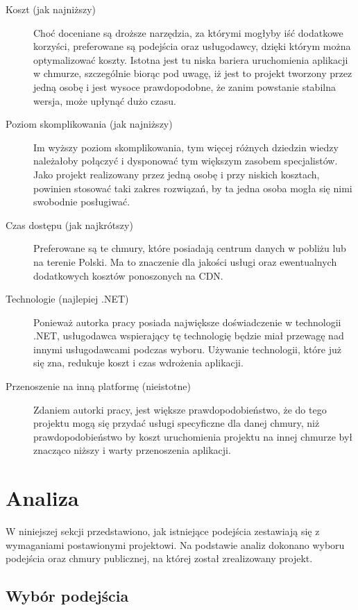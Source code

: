 \documentclass[12pt,a4paper,twoside,titlepage,openright]{book}
\begin{document}
\begin{description}
\item [Koszt (jak najniższy)] Choć doceniane są droższe narzędzia, za którymi mogłyby iść dodatkowe korzyści, preferowane są podejścia oraz usługodawcy, dzięki którym można optymalizować koszty. Istotna jest tu niska bariera uruchomienia aplikacji w chmurze, szczególnie biorąc pod uwagę, iż jest to projekt tworzony przez jedną osobę i jest wysoce prawdopodobne, że zanim powstanie stabilna wersja, może upłynąć dużo czasu.
\item [Poziom skomplikowania (jak najniższy)] Im wyższy poziom skomplikowania, tym więcej różnych dziedzin wiedzy należałoby połączyć i dysponować tym większym zasobem specjalistów. Jako projekt realizowany przez jedną osobę i przy niskich kosztach, powinien stosować taki zakres rozwiązań, by ta jedna osoba mogła się nimi swobodnie posługiwać.
\item [Czas dostępu (jak najkrótszy)] Preferowane są te chmury, które posiadają centrum danych w pobliżu lub na terenie Polski. Ma to znaczenie dla jakości usługi oraz ewentualnych dodatkowych kosztów ponoszonych na CDN.
\item [Technologie (najlepiej .NET)] Ponieważ autorka pracy posiada największe doświadczenie w technologii .NET, usługodawca wspierający tę technologię będzie miał przewagę nad innymi usługodawcami podczas wyboru. Używanie technologii, które już się zna, redukuje koszt i czas wdrożenia aplikacji.
\item [Przenoszenie na inną platformę (nieistotne)] Zdaniem autorki pracy, jest większe prawdopodobieństwo, że do tego projektu mogą się przydać usługi specyficzne dla danej chmury, niż prawdopodobieństwo by koszt uruchomienia projektu na innej chmurze był znacząco niższy i warty przenoszenia aplikacji. 
\end{description}

\section{Analiza}

W niniejszej sekcji przedstawiono, jak istniejące podejścia zestawiają się z wymaganiami postawionymi projektowi. Na podstawie analiz dokonano wyboru podejścia oraz chmury publicznej, na której został zrealizowany projekt.

\subsection{Wybór podejścia}
\end{document}

